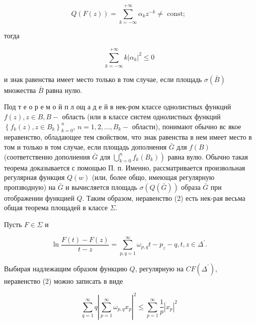 \documentclass[10pt]{article}
\begin{document}
\[

Q(F(z))=\sum_{k=-\infty}^{+\infty} \alpha_{k} z^{-k} \neq \text { const; }

\]



тогда



\[

\sum_{k=-\infty}^{+\infty} k\left|\alpha_{k}\right|^{2} \leqslant 0

\]



и знак равенства имеет место только в том случае, если площадь $\sigma(\bar{B})$ множества $\bar{B}$ равна нулю.



Под т е о р е м о й п л ощ а д е й в нек-ром классе однолистных функций $f(z), z \in B, B-$ область (или в классе систем однолистных функций $\left\{f_{k}(z), z \in B_{k}\right\}_{k=0}^{n}$, $n=1,2, \ldots, B_{k}-$ области), понимают обычно вс якое неравенство, обладающее тем свойством, что знак равенства в нем имеет место в том и только в том случае, если площадь дополнения $\bar{G}$ для $f(B)$ (соответственно дополнения $\bar{G}$ для $\left.\bigcup_{k=0}^{n} f_{k}\left(B_{k}\right)\right)$ равна вулю. Обычно такая теорема доказывается с помощью П. п. Именно, рассматривается произвольная регулярная функция $Q(w)$ (или, более общо, имеющая регулярную пропзводную) на $\bar{G}$ и вычисляется площадь $\sigma(Q(\bar{G}))$ образа $\bar{G}$ при отображении функцией $Q$. Таким образом, неравенство (2) есть нек-рая весьма общая теорема площадей в классе $\Sigma$.



Пусть $F \in \Sigma$ и



\[

\ln \frac{F(t)-F(z)}{t-z}=\sum_{p, q=1}^{\infty} \omega_{p, q} t-p_{z}-q, t, z \in \Delta^{\prime} .

\]



Выбирая надлежащим образом функцию $Q$, регулярную на $C F\left(\Delta^{\prime}\right)$, неравенство (2) можно записать в виде



\[

\sum_{q=1}^{\infty} q\left|\sum_{p=1}^{\infty} \omega_{p, q} x_{p}\right|^{2} \leqslant \sum_{p=1}^{\infty} \frac{1}{p}\left|x_{p}\right|^{2}

\]
\end{document}
